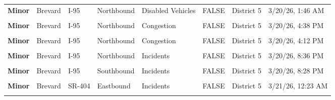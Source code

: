 \documentclass[
]{article}
\begin{document}
\begin{longtable}[t]{>{\raggedright\arraybackslash}p{1.5cm}>{\raggedright\arraybackslash}p{2.5cm}>{\raggedright\arraybackslash}p{3cm}>{\raggedright\arraybackslash}p{1.8cm}>{\raggedright\arraybackslash}p{2.5cm}lll}
\addlinespace
\textbf{Minor} & Brevard & I-95 & Northbound & Disabled Vehicles & FALSE & District 5 & 3/20/26, 1:46 AM\\
\textbf{\cellcolor{gray!10}{Minor}} & \cellcolor{gray!10}{Brevard} & \cellcolor{gray!10}{I-95} & \cellcolor{gray!10}{Northbound} & \cellcolor{gray!10}{Disabled Vehicles} & \cellcolor{gray!10}{FALSE} & \cellcolor{gray!10}{District 5} & \cellcolor{gray!10}{3/20/26, 7:28 AM}\\
\textbf{Minor} & Brevard & I-95 & Northbound & Congestion & FALSE & District 5 & 3/20/26, 4:38 PM\\
\textbf{\cellcolor{gray!10}{Minor}} & \cellcolor{gray!10}{Brevard} & \cellcolor{gray!10}{I-95} & \cellcolor{gray!10}{Northbound} & \cellcolor{gray!10}{Disabled Vehicles} & \cellcolor{gray!10}{FALSE} & \cellcolor{gray!10}{District 5} & \cellcolor{gray!10}{3/20/26, 4:44 PM}\\
\textbf{Minor} & Brevard & I-95 & Northbound & Congestion & FALSE & District 5 & 3/20/26, 4:12 PM\\
\addlinespace
\textbf{\cellcolor{gray!10}{Minor}} & \cellcolor{gray!10}{Brevard} & \cellcolor{gray!10}{I-95} & \cellcolor{gray!10}{Northbound} & \cellcolor{gray!10}{Congestion} & \cellcolor{gray!10}{FALSE} & \cellcolor{gray!10}{District 5} & \cellcolor{gray!10}{3/20/26, 6:46 PM}\\
\textbf{Minor} & Brevard & I-95 & Northbound & Incidents & FALSE & District 5 & 3/20/26, 8:36 PM\\
\textbf{\cellcolor{gray!10}{Minor}} & \cellcolor{gray!10}{Brevard} & \cellcolor{gray!10}{I-95} & \cellcolor{gray!10}{Southbound} & \cellcolor{gray!10}{Congestion} & \cellcolor{gray!10}{FALSE} & \cellcolor{gray!10}{District 5} & \cellcolor{gray!10}{3/20/26, 8:48 PM}\\
\textbf{Minor} & Brevard & I-95 & Southbound & Incidents & FALSE & District 5 & 3/20/26, 8:28 PM\\
\textbf{\cellcolor{gray!10}{Minor}} & \cellcolor{gray!10}{Brevard} & \cellcolor{gray!10}{I-95} & \cellcolor{gray!10}{Southbound} & \cellcolor{gray!10}{Disabled Vehicles} & \cellcolor{gray!10}{FALSE} & \cellcolor{gray!10}{District 5} & \cellcolor{gray!10}{3/20/26, 8:28 PM}\\
\addlinespace
\textbf{Minor} & Brevard & SR-404 & Eastbound & Incidents & FALSE & District 5 & 3/21/26, 12:23 AM\\
\textbf{\cellcolor{gray!10}{Minor}} & \cellcolor{gray!10}{Brevard} & \cellcolor{gray!10}{I-95} & \cellcolor{gray!10}{Northbound} & \cellcolor{gray!10}{Disabled Vehicles} & \cellcolor{gray!10}{FALSE} & \cellcolor{gray!10}{District 5} & \cellcolor{gray!10}{3/21/26, 7:28 AM}\\

\end{longtable}
\end{document}
